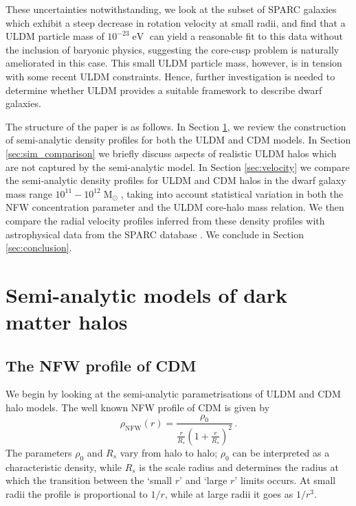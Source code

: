 \documentclass[a4paper,11pt]{article}
\begin{document}
These uncertainties notwithstanding, we look at the subset of SPARC galaxies which exhibit a steep decrease in rotation velocity at small radii, and find that a ULDM particle mass of $10^{-23}\operatorname{eV}$ can yield a reasonable fit to this data without the inclusion of baryonic physics, suggesting the core-cusp problem is naturally ameliorated in this case. This  small ULDM particle mass, however, is in tension with some recent ULDM constraints. Hence, further investigation is needed to determine whether ULDM provides a suitable framework to describe dwarf galaxies.  

The structure of the paper is as follows. In Section \ref{sec:models}, we review the construction of semi-analytic density profiles for both the ULDM and CDM models. In Section \ref{sec:sim_comparison} we briefly discuss aspects of realistic ULDM halos which are not captured by the semi-analytic model. In Section \ref{sec:velocity} we compare the semi-analytic density profiles for ULDM and CDM halos in the dwarf galaxy mass range $10^{11} - 10^{12}\operatorname{M}_{\odot}$, taking into account statistical variation in both the NFW concentration parameter and the ULDM core-halo mass relation. We then compare the radial velocity profiles inferred from these density profiles with astrophysical data from the SPARC database \cite{Lelli:2016zqa}. We conclude in Section \ref{sec:conclusion}.

\clearpage





\section{Semi-analytic models of dark matter halos}\label{sec:models}


\subsection{The NFW profile of CDM}\label{sec:NFW}

We begin by looking at the semi-analytic parametrisations of ULDM and CDM halo models. The  well known  NFW   profile of CDM \cite{Navarro:1995iw, Maccio:2008pcd}  is given by
%
\begin{equation}\label{eq:nfw}
    \rho_\mathrm{NFW}(r)=\frac{\rho_0}{\frac{r}{R_s}\left(1+\frac{r}{R_s}\right)^2} \, .
\end{equation}
%
The parameters $\rho_0$ and $R_s$ vary from halo to halo; $\rho_0$ can be interpreted as a characteristic density, while $R_s$ is the scale radius and determines the radius at which the transition between the `small $r$' and `large $r$' limits occurs. At small radii the profile is proportional to $1/r$, while at large radii it goes as $1/r^3$.
\end{document}
